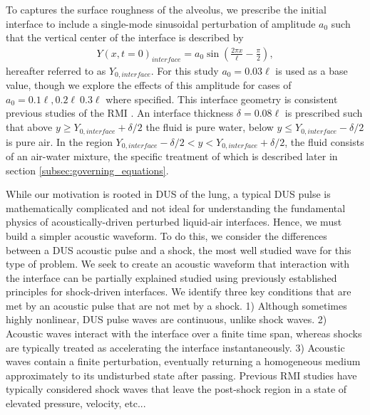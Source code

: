 \documentclass{jfm}%
\begin{document}
To captures the surface roughness of the alveolus, we prescribe the
initial interface to include a single-mode sinusoidal perturbation of
amplitude $a_0$ such that the vertical center of the interface is
described by
\begin{align} %
  Y(x,t=0)_{interface} = a_0\sin\left(\frac{2\pi x}{\ell}-\frac{\pi}{2}\right),
\end{align}
hereafter referred to as $Y_{0,interface}$. For this study
$a_0=0.03\ell$ is used as a base value, though we explore the effects
of this amplitude for cases of $a_0=0.1\ell, 0.2\ell\ 0.3\ell$ where
specified. This interface geometry is consistent previous studies of
the \ac{RMI} \citep{Brouillette2002}. An interface thickness
$\delta=0.08\ell$ is prescribed such that above
$y\geq Y_{0,interface}+\delta/2$ the fluid is pure water, below
$y\leq Y_{0,interface}-\delta/2$ is pure air. In the region
$Y_{0,interface}-\delta/2 < y < Y_{0,interface}+\delta/2$, the fluid
consists of an air-water mixture, the specific treatment of which is
described later in section \ref{subsec:governing_equations}.

While our motivation is rooted in \ac{DUS} of the lung, a typical
\ac{DUS} pulse is mathematically complicated and not ideal for
understanding the fundamental physics of acoustically-driven perturbed
liquid-air interfaces. Hence, we must build a simpler acoustic
waveform. To do this, we consider the differences between a \ac{DUS}
acoustic pulse and a shock, the most well studied wave for this type
of problem. We seek to create an acoustic waveform that interaction
with the interface can be partially explained studied using previously
established principles for shock-driven interfaces. We identify three
key conditions that are met by an acoustic pulse that are not met by a
shock. 1) Although sometimes highly nonlinear, \ac{DUS} pulse waves
are continuous, unlike shock waves. 2) Acoustic waves interact with
the interface over a finite time span, whereas shocks are typically
treated as accelerating the interface instantaneously. 3) Acoustic
waves contain a finite perturbation, eventually returning a
homogeneous medium approximately to its undisturbed state after
passing. Previous \ac{RMI} studies have typically considered shock
waves that leave the post-shock region in a state of elevated
pressure, velocity, etc... 
\end{document}

